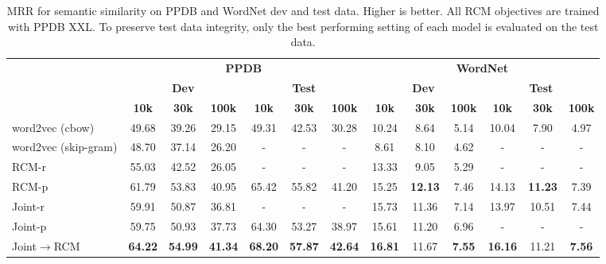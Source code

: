 \documentclass[11pt]{article}
\newcommand{\figref}[1]{Figure~\ref{#1}}
\begin{document}
\begin{table*}[t]
\centering
\small
	\begin{tabular}{|l|c|c|c|c|c|c|c|c|c|c|c|c|}
	\hline
	\multirow{2}{*}{} &  \multicolumn{6}{|c|}{\bf PPDB} & \multicolumn{6}{|c|}{\bf WordNet}\\
	\multirow{2}{*}{\bf Model} &  \multicolumn{3}{|c|}{\bf Dev} & \multicolumn{3}{|c|}{\bf Test} &  \multicolumn{3}{|c|}{\bf Dev} & \multicolumn{3}{|c|}{\bf Test} \\
	\cline{2-13}
	& \bf 10k & \bf 30k & \bf 100k & \bf 10k & \bf 30k & \bf 100k & \bf 10k & \bf 30k & \bf 100k & \bf 10k & \bf 30k & \bf 100k \\
	\hline
	word2vec (cbow) & 49.68 & 39.26 & 29.15 & 49.31 & 42.53 & 30.28 & 10.24 & 8.64& 5.14& 10.04 & 7.90 & 4.97 \\
	word2vec (skip-gram) & 48.70 & 37.14 & 26.20 & - & - & - & 8.61 & 8.10 & 4.62 &- &- &- \\
	\hline
        RCM-r &55.03 & 42.52& 26.05 & - &- &- & 13.33 & 9.05 & 5.29 & - & - & - \\ 
	RCM-p  & 61.79 & 53.83 & 40.95  & 65.42 & 55.82& 41.20&15.25 &\bf 12.13 &7.46 & 14.13 & \bf 11.23 &7.39 \\
	Joint-r  & 59.91 & 50.87 & 36.81 & -& -& -&15.73 & 11.36 & 7.14 & 13.97 & 10.51 & 7.44\\ 
	Joint-p & 59.75 & 50.93 & 37.73 & 64.30& 53.27 & 38.97 & 15.61 & 11.20 & 6.96 & - & - & - \\
	Joint$\rightarrow$RCM & \bf 64.22 & \bf 54.99 & \bf 41.34 & \bf 68.20 & \bf 57.87 & \bf 42.64 & \bf 16.81 & 11.67 &\bf 7.55 & \bf 16.16 & 11.21 & \bf 7.56 \\ 
	\hline
	\end{tabular}
\caption{MRR for semantic similarity on PPDB and WordNet dev and test data. Higher is better. All RCM objectives are trained with PPDB XXL.
To preserve test data integrity, only the best performing setting of each model is evaluated on the test data.}
\label{tab:similarity}
\vspace{-.3cm}
\end{table*}


\end{document}
